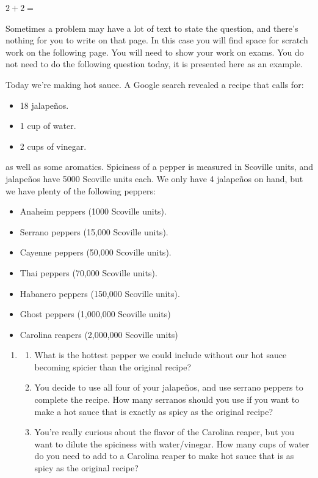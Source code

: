 \documentclass[12pt]{article}
\begin{document}
\mbox{}

\begin{enumerate}
  \setcounter{problemnumber}{0}
\Problem $2+2=$ 

\end{enumerate}

\bigskip



Sometimes a problem may have a lot of text to state the question, and there's nothing for you to write on that page. In this case you will find space for scratch work on the following page. You will need to show your work on exams. You do not need to do the following question today, it is presented here as an example. 
\bigskip
\begin{enumerate}
  \setcounter{problemnumber}{1}
\Problem Today we're making hot sauce. A Google search revealed a recipe that
calls for:
\begin{itemize}
\item 18 jalape\~nos.
\item 1 cup of water.
\item 2 cups of vinegar.
\end{itemize}
as well as some aromatics.
Spiciness of a pepper is measured in Scoville units, and jalape\~nos have 5000 Scoville units
each.
We only have 4 jalape\~nos on hand, but we have plenty of the following peppers: 

\begin{itemize}
\item Anaheim peppers (1000 Scoville units).
\item Serrano peppers (15,000 Scoville units).
\item Cayenne peppers (50,000 Scoville units).
\item Thai peppers (70,000 Scoville units).
\item Habanero peppers (150,000 Scoville units).
\item Ghost peppers (1,000,000 Scoville units)
\item Carolina reapers (2,000,000 Scoville units)
\end{itemize}

\begin{enumerate}[label=]\item
\begin{enumerate}[label=\roman*)]

\item What is the hottest pepper we could include without our hot sauce becoming spicier
than the original recipe?
\item You decide to use all four of your jalape\~nos, and use serrano peppers to complete
the recipe. How many serranos should you use if you want to make a hot sauce that
is exactly as spicy as the original recipe?
\item You're really curious about the flavor of the Carolina reaper, but you want to dilute
the spiciness with water/vinegar. How many cups of water do you need to add to a Carolina reaper to make hot
sauce that is as spicy as the original recipe?
\end{enumerate}
\end{enumerate}



\end{enumerate}
\end{document}
